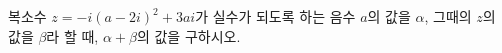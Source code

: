 복소수 $z=-i(a-2i)^2+3ai$가 실수가 되도록 하는 음수 $a$의 값을 $\alpha$, 그때의 $z$의 값을 $\beta$라 할 때, $\alpha+\beta$의 값을 구하시오.
